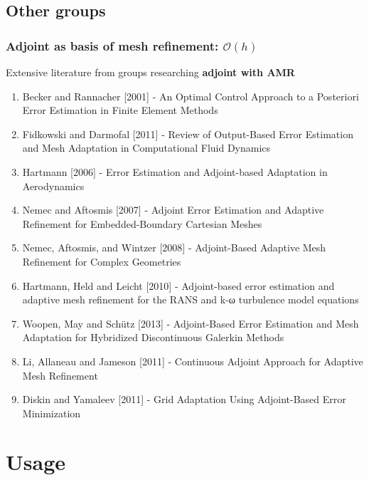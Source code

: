 \documentclass{beamer}
\begin{document}
\subsection{Other groups}
\begin{frame}%
\frametitle{Adjoint as basis of mesh refinement: $\mathcal{O}(h)$}
\scriptsize
Extensive literature from groups researching \textbf{adjoint with AMR}
\begin{enumerate}[1.]
\item Becker and Rannacher [2001] - An Optimal Control Approach to a Posteriori Error Estimation in Finite Element Methods
\item Fidkowski and Darmofal [2011] - Review of Output-Based Error Estimation and Mesh Adaptation in Computational Fluid Dynamics
\item Hartmann [2006] - Error Estimation and Adjoint-based Adaptation in Aerodynamics
\item Nemec and Aftosmis [2007] - Adjoint Error Estimation and Adaptive Refinement for Embedded-Boundary Cartesian Meshes
\item Nemec, Aftosmis, and Wintzer [2008] - Adjoint-Based Adaptive Mesh Refinement for Complex Geometries
\item Hartmann, Held and Leicht [2010] - Adjoint-based error estimation and adaptive mesh refinement for the RANS and k-ω turbulence model equations
\item Woopen, May and Sch{\"u}tz [2013] - Adjoint-Based Error Estimation and Mesh Adaptation for Hybridized Discontinuous Galerkin Methods
\item Li, Allaneau and Jameson [2011] - Continuous Adjoint Approach for Adaptive Mesh Refinement
\item Diskin and Yamaleev [2011] - Grid Adaptation Using Adjoint-Based Error Minimization
\end{enumerate}
\end{frame}




\section[Usage]{Usage}
\end{document}
